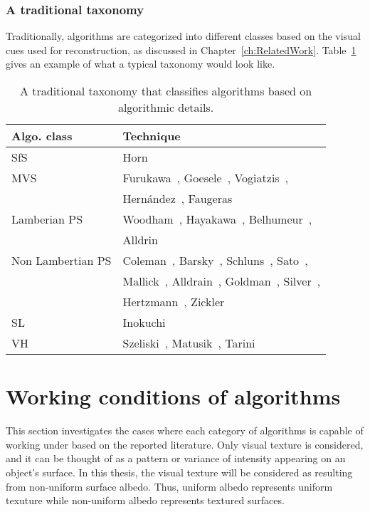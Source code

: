 \subsubsection{A traditional taxonomy}
Traditionally, algorithms are categorized into different classes based on the visual cues used for reconstruction, as discussed in Chapter~\ref{ch:RelatedWork}. 
Table~\ref{tab:class_algo} gives an example of what a typical taxonomy would look like.
\begin{table}[!htbp]
  \centering
  \begin{tabular}{l|l}
  \toprule
  \textbf{Algo. class} & \textbf{Technique}\\
  \midrule
  SfS & Horn~\cite{horn1970shape}\\
  MVS & Furukawa~\cite{furukawa2010accurate}, Goesele~\cite{goesele2006multi}, Vogiatzis~\cite{vogiatzis2007multiview}, \\
      & Hern{\'a}ndez~\cite{esteban2004silhouette}, Faugeras~\cite{faugeras2002variational}\\
  Lamberian PS & Woodham~\cite{woodham1980photometric}, Hayakawa~\cite{hayakawa1994photometric}, Belhumeur~\cite{belhumeur1999bas}, \\
      & Alldrin~\cite{alldrin2007resolving}\\
  Non Lambertian PS & Coleman~\cite{coleman1982obtaining}, Barsky~\cite{barsky20034}, Schluns~\cite{schluns1993photometric}, Sato~\cite{sato1994temporal}, \\
      & Mallick~\cite{mallick2005beyond}, Alldrain~\cite{alldrin2008photometric}, Goldman~\cite{goldman2010shape}, Silver~\cite{silver1980determining}, \\
      & Hertzmann~\cite{hertzmann2005example}, Zickler~\cite{zickler2002helmholtz}\\
  SL & Inokuchi~\cite{inokuchi1984range}\\
  VH & Szeliski~\cite{szeliski1993rapid}, Matusik~\cite{matusik2002efficient}, Tarini~\cite{tarini2002marching}\\
  \bottomrule
  \end{tabular}
  \caption{A traditional taxonomy that classifies algorithms based on algorithmic details.}
  \label{tab:class_algo}
\end{table}

\section{Working conditions of algorithms}
This section investigates the cases where each category of algorithms is capable of working under based on the reported literature. Only visual texture is considered, and it can be thought of as a pattern or variance of intensity appearing on an object's surface. In this thesis, the visual texture will be considered as resulting from non-uniform surface albedo. Thus, uniform albedo represents uniform texuture while non-uniform albedo represents textured surfaces.

